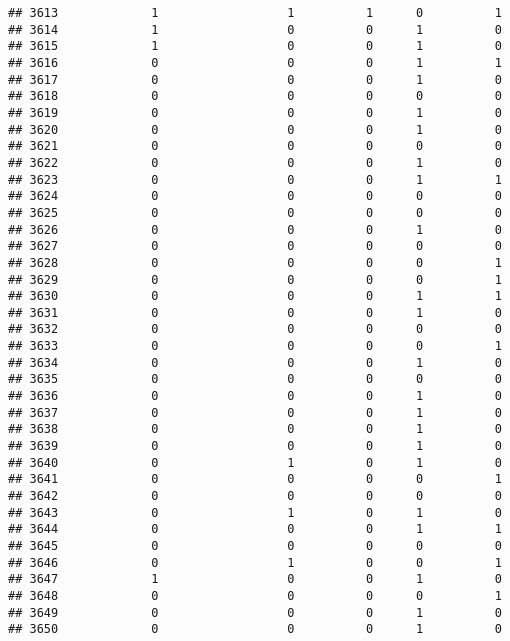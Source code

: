 \documentclass[
]{article}
\begin{document}
\begin{verbatim}
## 3613             1                  1          1      0          1
## 3614             1                  0          0      1          0
## 3615             1                  0          0      1          0
## 3616             0                  0          0      1          1
## 3617             0                  0          0      1          0
## 3618             0                  0          0      0          0
## 3619             0                  0          0      1          0
## 3620             0                  0          0      1          0
## 3621             0                  0          0      0          0
## 3622             0                  0          0      1          0
## 3623             0                  0          0      1          1
## 3624             0                  0          0      0          0
## 3625             0                  0          0      0          0
## 3626             0                  0          0      1          0
## 3627             0                  0          0      0          0
## 3628             0                  0          0      0          1
## 3629             0                  0          0      0          1
## 3630             0                  0          0      1          1
## 3631             0                  0          0      1          0
## 3632             0                  0          0      0          0
## 3633             0                  0          0      0          1
## 3634             0                  0          0      1          0
## 3635             0                  0          0      0          0
## 3636             0                  0          0      1          0
## 3637             0                  0          0      1          0
## 3638             0                  0          0      1          0
## 3639             0                  0          0      1          0
## 3640             0                  1          0      1          0
## 3641             0                  0          0      0          1
## 3642             0                  0          0      0          0
## 3643             0                  1          0      1          0
## 3644             0                  0          0      1          1
## 3645             0                  0          0      0          0
## 3646             0                  1          0      0          1
## 3647             1                  0          0      1          0
## 3648             0                  0          0      0          1
## 3649             0                  0          0      1          0
## 3650             0                  0          0      1          0

\end{verbatim}
\end{document}
